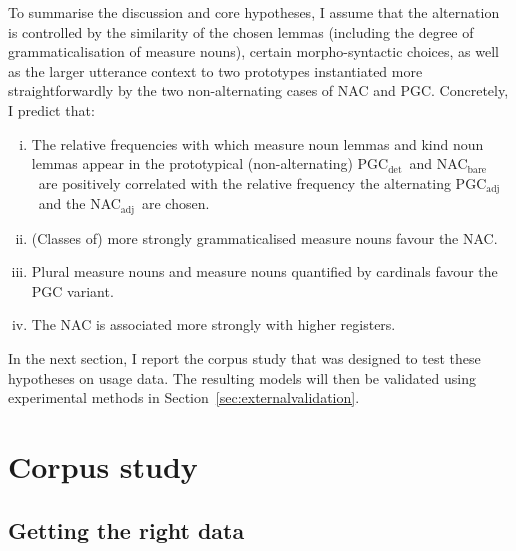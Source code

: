 \documentclass[USenglish]{article}
\newcommand{\Sub}[1]{\ensuremath{\mathrm{_{#1}}}}
\newcommand{\NACb}{NAC\Sub{bare}}
\newcommand{\NACa}{NAC\Sub{adj}}
\newcommand{\PGCd}{PGC\Sub{det}}
\newcommand{\PGCa}{PGC\Sub{adj}}
\begin{document}
To summarise the discussion and core hypotheses, I assume that the alternation is controlled by the similarity of the chosen lemmas (including the degree of grammaticalisation of measure nouns), certain morpho-syntactic choices, as well as the larger utterance context to two prototypes instantiated more straightforwardly by the two non-alternating cases of NAC and PGC.
Concretely, I predict that:

\begin{enumerate}[i.]
  \item The relative frequencies with which measure noun lemmas and kind noun lemmas appear in the prototypical (non-alternating) \PGCd\ and \NACb\ are positively correlated with the relative frequency the alternating \PGCa\ and the \NACa\ are chosen.
  \item (Classes of) more strongly grammaticalised measure nouns favour the NAC.
  \item Plural measure nouns and measure nouns quantified by cardinals favour the PGC variant.
  \item The NAC is associated more strongly with higher registers.
\end{enumerate}

\vspace{-1\baselineskip}

In the next section, I report the corpus study that was designed to test these hypotheses on usage data.
The resulting models will then be validated using experimental methods in Section~\ref{sec:externalvalidation}.





\section{Corpus study}
\label{sec:corpusstudies}


\subsection{Getting the right data}
\label{sec:gettingdata}

\end{document}
